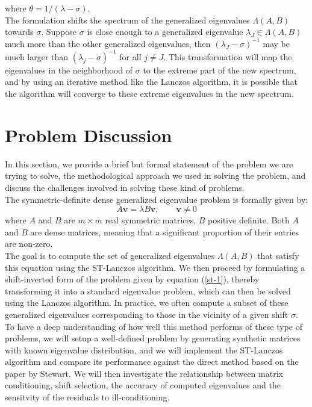 where $\theta = 1 / (\lambda - \sigma)$.\\
The formulation shifts the spectrum of the generalized eigenvalues $\Lambda(A, B)$ towards $\sigma$. Suppose $\sigma$ is close enough to a generalized eigenvalue $\lambda_J \in \Lambda(A, B)$ much more than the other generalized eigenvalues, then $(\lambda_J - \sigma)^{-1}$ may be much larger than $(\lambda_j - \sigma)^{-1}$ for all $j \neq J$. This transformation will map the eigenvalues in the neighborhood of $\sigma$ to the extreme part of the new spectrum, and by using an iterative method like the Lanczos algorithm, it is possible that the algorithm will converge to these extreme eigenvalues in the new spectrum.
\section{Problem Discussion}
In this section, we provide a brief but formal statement of the problem we are trying to solve, the methodological approach we used in solving the problem, and discuss the challenges involved in solving these kind of problems.\\[5pt]
The symmetric-definite dense generalized eigenvalue problem is formally given by:
\begin{equation}\label{1.18}
	A\mathbf{v} = \lambda B\mathbf{v}, \qquad \mathbf{v} \neq 0
\end{equation}
where $A$ and $B$ are $m \times m$ real symmetric matrices, $B$ positive definite. Both $A$ and $B$ are dense matrices, meaning that a significant proportion of their entries are non-zero.\\[5pt]
The goal is to compute the set of generalized eigenvalues $\Lambda(A, B)$ that satisfy this equation using the ST-Lanczos algorithm. We then proceed by formulating a shift-inverted form of the problem given by equation (\ref{st-1}), thereby transforming it into a standard eigenvalue problem, which can then be solved using the Lanczos algorithm. In practice, we often compute a subset of these generalized eigenvalues corresponding to those in the vicinity of a given shift $\sigma$. To have a deep understanding of how well this method performs of these type of problems, we will setup a well-defined problem by generating synthetic matrices with known eigenvalue distribution, and we will implement the ST-Lanczos algorithm and compare its performance against the direct method based on the paper by Stewart. We will then investigate the relationship between matrix conditioning, shift selection, the accuracy of computed eigenvalues and the sensitvity of the residuals to ill-conditioning.
